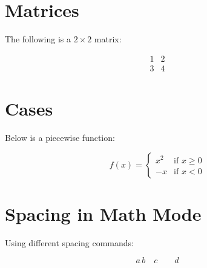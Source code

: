 \documentclass{article}
\begin{document}
\section{Matrices}
The following is a $2 \times 2$ matrix:

\[
\begin{matrix}
1 & 2 \\
3 & 4
\end{matrix}
\]

\section{Cases}
Below is a piecewise function:

\[
f(x) =
\begin{cases}
x^2 & \text{if } x \geq 0 \\
-x & \text{if } x < 0
\end{cases}
\]

\section{Spacing in Math Mode}
Using different spacing commands:

\[
a \, b \quad c \qquad d
\]
\end{document}
